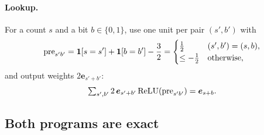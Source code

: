 \paragraph{Lookup.} For a count $s$ and a bit $b\in\{0,1\}$, use one unit per pair $(s',b')$ with
\[
 \mathrm{pre}_{s'b'}=\one[s=s']+\one[b=b']-\tfrac{3}{2}=\begin{cases}\tfrac{1}{2}&(s',b')=(s,b),\\\le-\tfrac{1}{2}&\text{otherwise},\end{cases}
\]
and output weights $2\bm e_{s'+b'}$:
\begin{equation}
 \textstyle\sum_{s',b'}2\,\bm e_{s'+b'}\operatorname{ReLU}(\mathrm{pre}_{s'b'})=\bm e_{s+b}.
 \label{eq:lookup}
\end{equation}

\subsection{Both programs are exact}
\label{app:exact}

